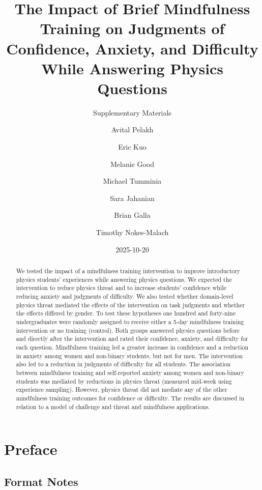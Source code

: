 \documentclass[
  letterpaper,
  DIV=11,
  numbers=noendperiod]{scrreprt}
\title{The Impact of Brief Mindfulness Training on Judgments of
Confidence, Anxiety, and Difficulty While Answering Physics Questions}
\subtitle{Supplementary Materials}
\author{Avital Pelakh \and Eric Kuo \and Melanie Good \and Michael
Tumminia \and Sara Jahanian \and Brian Galla \and Timothy Nokes-Malach}
\date{2025-10-20}
\renewcommand*\contentsname{Table of contents}
\newcommand\contentsname{Table of contents}
\begin{document}
\maketitle
\begin{abstract}
We tested the impact of a mindfulness training intervention to improve
introductory physics students' experiences while answering physics
questions. We expected the intervention to reduce physics threat and to
increase students' confidence while reducing anxiety and judgments of
difficulty. We also tested whether domain-level physics threat mediated
the effects of the intervention on task judgments and whether the
effects differed by gender. To test these hypotheses one hundred and
forty-nine undergraduates were randomly assigned to receive either a
5-day mindfulness training intervention or no training (control). Both
groups answered physics questions before and directly after the
intervention and rated their confidence, anxiety, and difficulty for
each question. Mindfulness training led a greater increase in confidence
and a reduction in anxiety among women and non-binary students, but not
for men. The intervention also led to a reduction in judgments of
difficulty for all students. The association between mindfulness
training and self-reported anxiety among women and non-binary students
was mediated by reductions in physics threat (measured mid-week using
experience sampling). However, physics threat did not mediate any of the
other mindfulness training outcomes for confidence or difficulty. The
results are discussed in relation to a model of challenge and threat and
mindfulness applications.
\end{abstract}

\renewcommand*\contentsname{Table of contents}
{
\hypersetup{linkcolor=}
\setcounter{tocdepth}{2}
\tableofcontents
}


\chapter*{Preface}\label{preface}


\section*{Format Notes}\label{format-notes}
\end{document}
